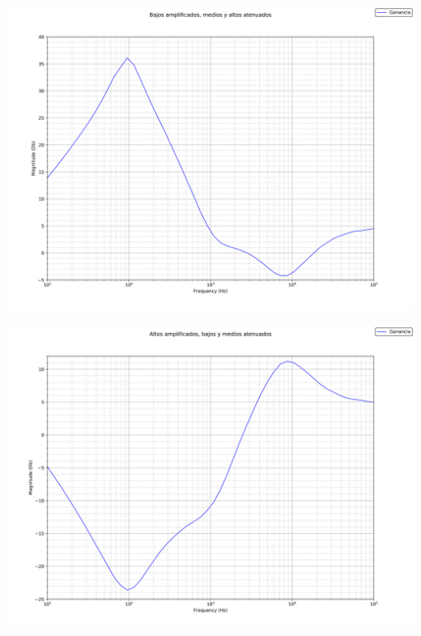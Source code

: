 \documentclass[a4paper,12pt,oneside,pdflatex,italian,final,twocolumn]{article}
\begin{document}
\begin{minipage}{0.47\textwidth}
  \includegraphics[width=\textwidth]{+B-M-A}
\end{minipage}
\hfill
\begin{minipage}{0.47\textwidth}
  \includegraphics[width=\textwidth]{-B-M+A}
\end{minipage}
\end{document}
